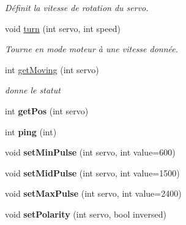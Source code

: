 \begin{DoxyCompactItemize}
\begin{DoxyCompactList}\small\item\em Définit la vitesse de rotation du servo. \end{DoxyCompactList}\item 
\mbox{\label{classServoDriver_ad68ebde8a710451c8fea2cd03cfa4bc0}} 
void \hyperlink{classServoDriver_ad68ebde8a710451c8fea2cd03cfa4bc0}{turn} (int servo, int speed)
\begin{DoxyCompactList}\small\item\em Tourne en mode moteur à une vitesse donnée. \end{DoxyCompactList}\item 
int \hyperlink{classServoDriver_a0a8e84f0bbcff39549ddfc239f1a6237}{get\+Moving} (int servo)
\begin{DoxyCompactList}\small\item\em donne le statut \end{DoxyCompactList}\item 
\mbox{\label{classServoDriver_a53c3d2e48084d579a2a570b97220c835}} 
int {\bfseries get\+Pos} (int servo)
\item 
\mbox{\label{classServoDriver_afc853f7f2f46acb7e4721f4ce4314522}} 
int {\bfseries ping} (int)
\item 
\mbox{\label{classServoDriver_a40ec259cb0ced3154b1e73cc52d48938}} 
void {\bfseries set\+Min\+Pulse} (int servo, int value=600)
\item 
\mbox{\label{classServoDriver_a92d53f7f50a7eb95e14ae358ad0b7d23}} 
void {\bfseries set\+Mid\+Pulse} (int servo, int value=1500)
\item 
\mbox{\label{classServoDriver_aaaeaab97cef5c2ebcd05c265fdff747f}} 
void {\bfseries set\+Max\+Pulse} (int servo, int value=2400)
\item 
\mbox{\label{classServoDriver_a89b2add38109f20260369e0a0d747bf2}} 
void {\bfseries set\+Polarity} (int servo, bool inversed)
\item 
\mbox{\label{classServoDriver_a2076bae148e26ee3f854f1f1984d9714}} 

\end{DoxyCompactItemize}
